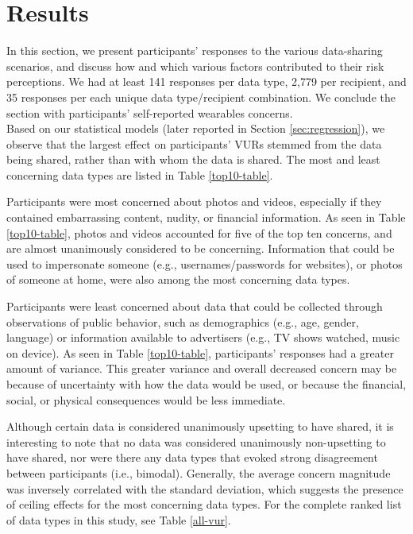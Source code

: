 \documentclass[conference]{IEEEtran}
\begin{document}
\section{Results}
In this section, we present participants' responses to the various data-sharing scenarios, and discuss how and which various factors contributed to their risk perceptions. We had at least 141 responses per data type, 2,779 per recipient, and 35 responses per each unique data type/recipient combination. We conclude the section with participants' self-reported wearables concerns.\\

Based on our statistical models (later reported in Section \ref{sec:regression}), we observe that the largest effect on participants' VURs stemmed from the data being shared, rather than  with whom the data is shared. The most and least concerning data types are listed in Table \ref{top10-table}. 

Participants were most concerned about photos and videos, especially if they contained embarrassing content, nudity, or financial information. As seen in Table \ref{top10-table}, photos and videos accounted for five of the top ten concerns, and are almost unanimously considered to be concerning. Information that could be used to impersonate someone (e.g., usernames/passwords for websites), or photos of someone at home, were also among the most concerning data types. 

Participants were least concerned about data that could be collected through observations of public behavior, such as demographics (e.g., age, gender, language) or information available to advertisers (e.g., TV shows watched, music on device). As seen in Table \ref{top10-table}, participants' responses had a greater amount of variance.  This greater variance and overall decreased concern may be because of uncertainty with how the data would be used, or because the financial, social, or physical consequences would be less immediate.

Although certain data is considered unanimously upsetting to have shared, it is interesting to note that no data was considered unanimously non-upsetting to have shared, nor were there any data types that evoked strong disagreement between participants (i.e., bimodal). Generally, the average concern magnitude was inversely correlated with the standard deviation, which suggests the presence of ceiling effects for the most concerning data types. For the complete ranked list of data types in this study, see Table \ref{all-vur}.\\
\end{document}
